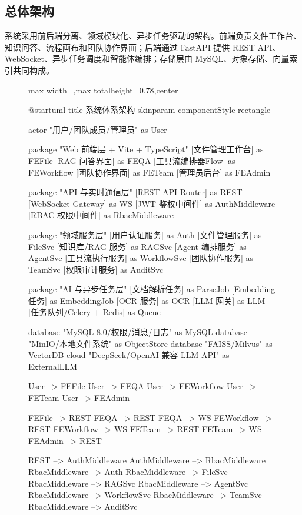 \documentclass[a4paper,zihao=-4]{ctexart}
\begin{document}
\hypertarget{ux603bux4f53ux67b6ux6784}{%
\subsection{总体架构}\label{ux603bux4f53ux67b6ux6784}}

系统采用前后端分离、领域模块化、异步任务驱动的架构。前端负责文件工作台、知识问答、流程画布和团队协作界面；后端通过
FastAPI 提供 REST API、WebSocket、异步任务调度和智能体编排；存储层由
MySQL、对象存储、向量索引共同构成。

\begin{figure}[H]
\centering
\begin{adjustbox}{max width=\linewidth,max totalheight=0.78\textheight,center}
\begingroup
\renewcommand{\PlantUMLJobname}{plantuml-diagrams/req-uml-01}
\begin{plantuml}
@startuml
title 系统体系架构
skinparam componentStyle rectangle

actor "用户/团队成员/管理员" as User

package "Web 前端层 + Vite + TypeScript" {
  [文件管理工作台] as FEFile
  [RAG 问答界面] as FEQA
  [工具流编排器\nVue Flow] as FEWorkflow
  [团队协作界面] as FETeam
  [管理员后台] as FEAdmin
}

package "API 与实时通信层\nFastAPI" {
  [REST API Router] as REST
  [WebSocket Gateway] as WS
  [JWT 鉴权中间件] as AuthMiddleware
  [RBAC 权限中间件] as RbacMiddleware
}

package "领域服务层" {
  [用户认证服务] as Auth
  [文件管理服务] as FileSvc
  [知识库/RAG 服务] as RAGSvc
  [Agent 编排服务] as AgentSvc
  [工具流执行服务] as WorkflowSvc
  [团队协作服务] as TeamSvc
  [权限审计服务] as AuditSvc
}

package "AI 与异步任务层" {
  [文档解析任务] as ParseJob
  [Embedding 任务] as EmbeddingJob
  [OCR 服务] as OCR
  [LLM 网关] as LLM
  [任务队列\nARQ/Celery + Redis] as Queue
}

database "MySQL 8.0/权限/消息/日志" as MySQL
database "MinIO/本地文件系统" as ObjectStore
database "FAISS/Milvus" as VectorDB
cloud "DeepSeek/OpenAI 兼容 LLM API" as ExternalLLM

User --> FEFile
User --> FEQA
User --> FEWorkflow
User --> FETeam
User --> FEAdmin

FEFile --> REST
FEQA --> REST
FEQA --> WS
FEWorkflow --> REST
FEWorkflow --> WS
FETeam --> REST
FETeam --> WS
FEAdmin --> REST

REST --> AuthMiddleware
AuthMiddleware --> RbacMiddleware
RbacMiddleware --> Auth
RbacMiddleware --> FileSvc
RbacMiddleware --> RAGSvc
RbacMiddleware --> AgentSvc
RbacMiddleware --> WorkflowSvc
RbacMiddleware --> TeamSvc
RbacMiddleware --> AuditSvc


\end{plantuml}
\end{adjustbox}
\end{figure}
\end{document}
